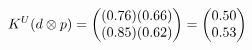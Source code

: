\documentclass[preview]{standalone}
\begin{document}
\begin{align*}
\special{dvisvgm:raw <g id='unique000'>}K^U(d \otimes p) = \begin{pmatrix} (0.76)(0.66) \\ (0.85)(0.62) \end{pmatrix} = \begin{pmatrix} 0.50 \\ 0.53 \end{pmatrix}\special{dvisvgm:raw </g>}
\end{align*}
\end{document}
